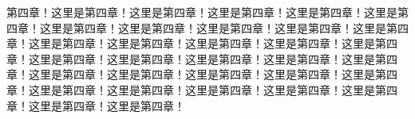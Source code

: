 第四章！这里是第四章！这里是第四章！这里是第四章！这里是第四章！这里是第四章！这里是第四章！这里是第四章！这里是第四章！这里是第四章！这里是第四章！这里是第四章！这里是第四章！这里是第四章！这里是第四章！这里是第四章！这里是第四章！这里是第四章！这里是第四章！这里是第四章！这里是第四章！这里是第四章！这里是第四章！这里是第四章！这里是第四章！这里是第四章！这里是第四章！这里是第四章！这里是第四章！这里是第四章！这里是第四章！这里是第四章！这里是第四章！
